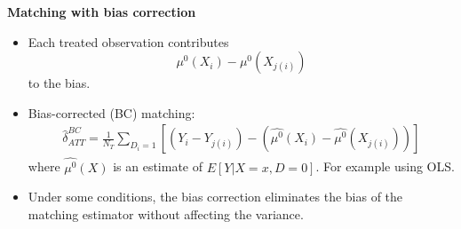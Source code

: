 \documentclass[notes=show]{beamer}
\begin{document}
\begin{frame}[plain]
	\begin{center}
	\textbf{Matching with bias correction}
	\end{center}
	
	\begin{itemize}
	\item Each treated observation contributes$$\mu^0(X_i) - \mu^0(X_{j(i)})$$to the bias.
	\item Bias-corrected (BC) matching:
		\begin{eqnarray*}
		\widehat{\delta}_{ATT}^{BC} = \frac{1}{N_T} \sum_{D_i=1} \left[ (Y_i - Y_{j(i)}) - ( \widehat{\mu^0}(X_i) - \widehat{\mu^0}(X_{j(i)}) ) \right]
		\end{eqnarray*}where $\widehat{\mu^0}(X)$ is an estimate of $E[Y|X=x,D=0]$.  For example using OLS.  
	\item Under some conditions, the bias correction eliminates the bias of the matching estimator without affecting the variance.
	\end{itemize}
\end{frame}
\end{document}
